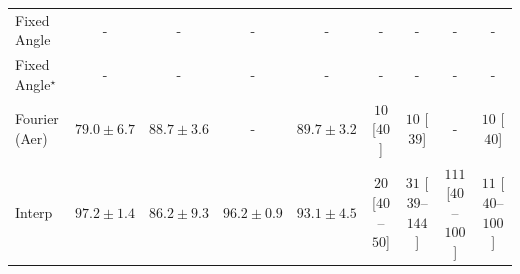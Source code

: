 \begin{tabular}{l|cccc|cccc|}
Fixed Angle & {\cellcolor[HTML]{000000}} \color[HTML]{F1F1F1} {\cellcolor{white}} \color{black} - & {\cellcolor[HTML]{000000}} \color[HTML]{F1F1F1} {\cellcolor{white}} \color{black} - & {\cellcolor[HTML]{000000}} \color[HTML]{F1F1F1} {\cellcolor{white}} \color{black} - & {\cellcolor[HTML]{000000}} \color[HTML]{F1F1F1} {\cellcolor{white}} \color{black} - & {\cellcolor[HTML]{000000}} \color[HTML]{F1F1F1} {\cellcolor{white}} \color{black} - & {\cellcolor[HTML]{000000}} \color[HTML]{F1F1F1} {\cellcolor{white}} \color{black} - & {\cellcolor[HTML]{000000}} \color[HTML]{F1F1F1} {\cellcolor{white}} \color{black} - & {\cellcolor[HTML]{000000}} \color[HTML]{F1F1F1} {\cellcolor{white}} \color{black} - \\
Fixed Angle$^\star$ & {\cellcolor[HTML]{000000}} \color[HTML]{F1F1F1} {\cellcolor{white}} \color{black} - & {\cellcolor[HTML]{000000}} \color[HTML]{F1F1F1} {\cellcolor{white}} \color{black} - & {\cellcolor[HTML]{000000}} \color[HTML]{F1F1F1} {\cellcolor{white}} \color{black} - & {\cellcolor[HTML]{000000}} \color[HTML]{F1F1F1} {\cellcolor{white}} \color{black} - & {\cellcolor[HTML]{000000}} \color[HTML]{F1F1F1} {\cellcolor{white}} \color{black} - & {\cellcolor[HTML]{000000}} \color[HTML]{F1F1F1} {\cellcolor{white}} \color{black} - & {\cellcolor[HTML]{000000}} \color[HTML]{F1F1F1} {\cellcolor{white}} \color{black} - & {\cellcolor[HTML]{000000}} \color[HTML]{F1F1F1} {\cellcolor{white}} \color{black} - \\
Fourier (Aer) & {\cellcolor[HTML]{FFFCD6}} \color[HTML]{000000} $79.0\pm 6.7$ & {\cellcolor[HTML]{FB9225}} \color[HTML]{000000} $88.7\pm 3.6$ & {\cellcolor[HTML]{000000}} \color[HTML]{F1F1F1} {\cellcolor{white}} \color{black} - & {\cellcolor[HTML]{F4811D}} \color[HTML]{F1F1F1} $89.7\pm 3.2$ & {\cellcolor[HTML]{FFF7F3}} \color[HTML]{000000} $10$ [$40$] & {\cellcolor[HTML]{FFF7F3}} \color[HTML]{000000} $10$ [$39$] & {\cellcolor[HTML]{000000}} \color[HTML]{F1F1F1} {\cellcolor{white}} \color{black} - & {\cellcolor[HTML]{FFF7F3}} \color[HTML]{000000} $10$ [$40$] \\
Interp & {\cellcolor[HTML]{802D05}} \color[HTML]{F1F1F1} $97.2\pm 1.4$ & {\cellcolor[HTML]{FEBB47}} \color[HTML]{000000} $86.2\pm 9.3$ & {\cellcolor[HTML]{933204}} \color[HTML]{F1F1F1} $96.2\pm 0.9$ & {\cellcolor[HTML]{CF5004}} \color[HTML]{F1F1F1} $93.1\pm 4.5$ & {\cellcolor[HTML]{FFF5F1}} \color[HTML]{000000} $20$ [$40$--$50$] & {\cellcolor[HTML]{FEF1ED}} \color[HTML]{000000} $31$ [$39$--$144$] & {\cellcolor[HTML]{FDDBD7}} \color[HTML]{000000} $111$ [$40$--$100$] & {\cellcolor[HTML]{FFF7F3}} \color[HTML]{000000} $11$ [$40$--$100$] \\

\end{tabular}
